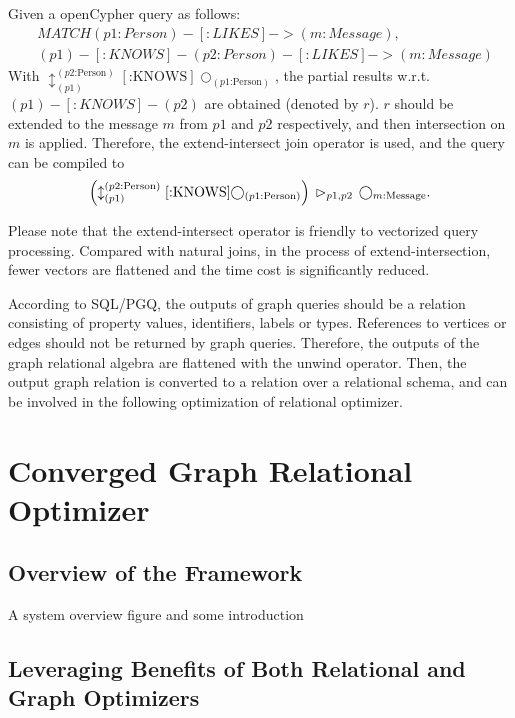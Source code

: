 \documentclass[sigconf, nonacm]{acmart}
\begin{document}
Given a openCypher query as follows:
\begin{equation}
    \begin{split}
        & MATCH (p1:Person)-[:LIKES]->(m:Message), \\
        & (p1)-[:KNOWS]-(p2:Person)-[:LIKES]->(m:Message)
    \end{split}
\end{equation}
With $\updownarrow^{(p2\text{:Person})}_{(p1)}[\text{:KNOWS}]\bigcirc_{(p1\text{:Person})}$, the partial results w.r.t.~$(p1)-[:KNOWS]-(p2)$ are obtained (denoted by $r$). 
$r$ should be extended to the message $m$ from $p1$ and $p2$ respectively, and then intersection on $m$ is applied.
Therefore, the extend-intersect join operator is used, and the query can be compiled to
\begin{equation}
    \left(\updownarrow^{(p2\text{:Person})}_{(p1)}[\text{:KNOWS}]\bigcirc_{(p1\text{:Person})}\right) \hspace{0.2em} \rhd_{p1, p2} \hspace{0.2em} \bigcirc_{m\text{:Message}}.
\end{equation}

Please note that the extend-intersect operator is friendly to vectorized query processing.
Compared with natural joins, in the process of extend-intersection, fewer vectors are flattened and the time cost is significantly reduced.

According to SQL/PGQ, the outputs of graph queries should be a relation consisting of property values, identifiers, labels or types.
References to vertices or edges should not be returned by graph queries.
Therefore, the outputs of the graph relational algebra are flattened with the unwind operator.
Then, the output graph relation is converted to a relation over a relational schema, and can be involved in the following optimization of relational optimizer.


\section{Converged Graph Relational Optimizer}

\subsection{Overview of the Framework}

A system overview figure and some introduction

\subsection{Leveraging Benefits of Both Relational and Graph Optimizers}
\end{document}
